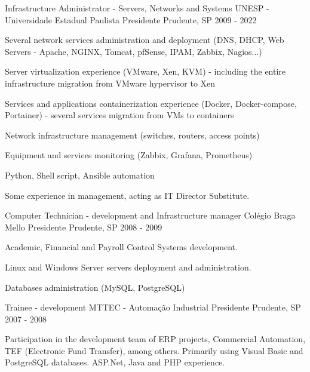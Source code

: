 \begin{cventries}
  \cventry
    {Infrastructure Administrator - Servers, Networks and Systems} %
    {UNESP - Universidade Estadual Paulista} %
    {Presidente Prudente, SP} %
    {2009 - 2022} %
    {
      \begin{cvitems} %
        \item {Several network services administration and deployment (DNS, DHCP, Web Servers - Apache, NGINX, Tomcat, pfSense, IPAM, Zabbix, Nagios...)}
        \item {Server virtualization experience (VMware, Xen, KVM) - including the entire infrastructure migration from VMware hypervisor to Xen}
        \item {Services and applications containerization experience (Docker, Docker-compose, Portainer) - several services migration from VMs to containers}
        \item {Network infrastructure management (switches, routers, access points)}
        \item {Equipment and services monitoring (Zabbix, Grafana, Prometheus)}
        \item {Python, Shell script, Ansible automation}
        \item {Some experience in management, acting as IT Director Substitute.}
      \end{cvitems}
    }

  \cventry
    {Computer Technician - development and Infrastructure manager} %
    {Colégio Braga Mello} %
    {Presidente Prudente, SP} %
    {2008 - 2009} %
    {
      \begin{cvitems} %
        \item {Academic, Financial and Payroll Control Systems development.}
        \item {Linux and Windows Server servers deployment and administration.}
        \item {Databases administration (MySQL, PostgreSQL)}
      \end{cvitems}
    }


\cventry
{Trainee - development} %
{MTTEC - Automação Industrial} %
{Presidente Prudente, SP} %
{2007 - 2008} %
{
  \begin{cvitems} %
    \item {Participation in the development team of ERP projects, Commercial Automation, TEF (Electronic Fund Transfer), among others. Primarily using Visual Basic and PostgreSQL databases. ASP.Net, Java and PHP experience.}
  \end{cvitems}
}



\end{cventries}
